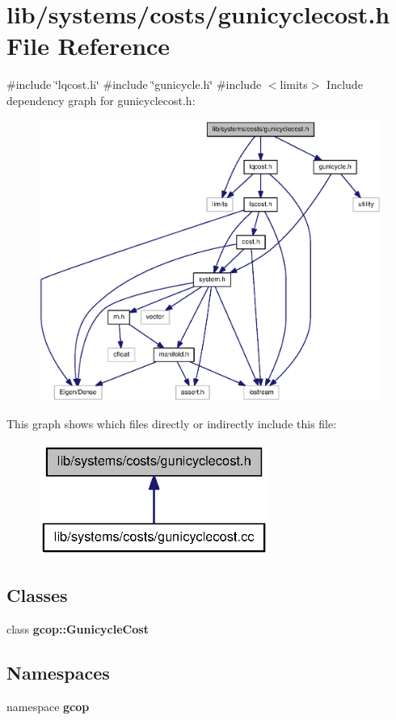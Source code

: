 \section{lib/systems/costs/gunicyclecost.h \-File \-Reference}
\label{gunicyclecost_8h}
{\ttfamily \#include \char`\"{}lqcost.\-h\char`\"{}}\*
{\ttfamily \#include \char`\"{}gunicycle.\-h\char`\"{}}\*
{\ttfamily \#include $<$limits$>$}\*
\-Include dependency graph for gunicyclecost.\-h\-:
\nopagebreak
\begin{figure}[H]
\begin{center}
\leavevmode
\includegraphics[width=350pt]{gunicyclecost_8h__incl}
\end{center}
\end{figure}
\-This graph shows which files directly or indirectly include this file\-:
\nopagebreak
\begin{figure}[H]
\begin{center}
\leavevmode
\includegraphics[width=214pt]{gunicyclecost_8h__dep__incl}
\end{center}
\end{figure}
\subsection*{\-Classes}
\begin{DoxyCompactItemize}
\item 
class {\bf gcop\-::\-Gunicycle\-Cost}
\end{DoxyCompactItemize}
\subsection*{\-Namespaces}
\begin{DoxyCompactItemize}
\item 
namespace {\bf gcop}
\end{DoxyCompactItemize}
